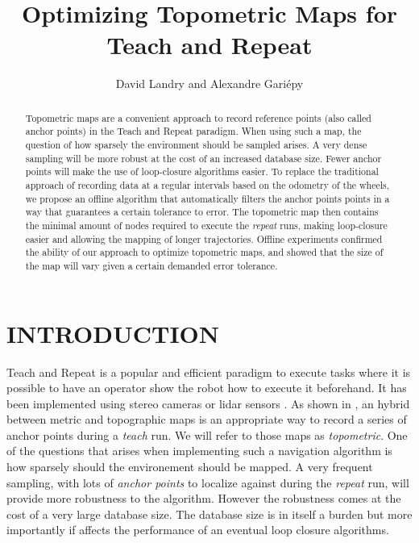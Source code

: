 \documentclass[letterpaper,10 pt,conference]{ieeeconf}
\title{\LARGE \bf
  Optimizing Topometric Maps for Teach and Repeat
}
\author{David Landry and Alexandre Gari\'epy}
\begin{document}
\maketitle
\thispagestyle{empty}
\pagestyle{empty}


\begin{abstract} Topometric maps are a convenient approach to record reference points (also called
anchor points) in the Teach and Repeat paradigm. When using such a map, the question of how sparsely
the environment should be sampled arises. A very dense sampling will be more robust at the cost of
an increased database size. Fewer anchor points will make the use of loop-closure algorithms
easier. To replace the traditional approach of recording data at a regular intervals based on the
odometry of the wheels, we propose an offline algorithm that automatically filters the anchor points
points in a way that guarantees a certain tolerance to error. The topometric map then contains the
minimal amount of nodes required to execute the \textit{repeat} runs, making loop-closure easier and
allowing the mapping of longer trajectories. Offline experiments confirmed the ability of our
approach to optimize topometric maps, and showed that the size of the map will vary given a certain
demanded error tolerance.
\end{abstract}

\section{INTRODUCTION}

Teach and Repeat is a popular and efficient paradigm to execute tasks where it is possible to have
an operator show the robot how to execute it beforehand. It has been implemented using stereo
cameras \cite{Furgale10} or lidar sensors \cite{Sprunk13}. As shown in \cite{Furgale10}, an hybrid
between metric and topographic maps is an appropriate way to record a series of anchor points during
a \textit{teach} run. We will refer to those maps as \textit{topometric}. One of the questions that
arises when implementing such a navigation algorithm is how sparsely should the environement should
be mapped. A very frequent sampling, with lots of \textit{anchor points} to localize against during
the \textit{repeat} run, will provide more robustness to the algorithm. However the robustness comes
at the cost of a very large database size. The database size is in itself a burden but more
importantly if affects the performance of an eventual loop closure algorithms.
\end{document}
